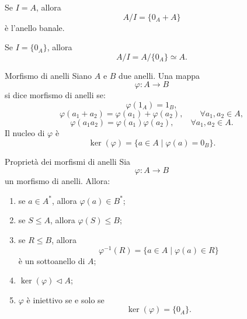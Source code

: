 \documentclass[a4paper]{article}
\begin{document}
\begin{radioactive}
Se \(I=A\), allora
\[
    A/I=\{0_A+A\}
\]
è l'anello banale.
\end{radioactive}

\begin{radioactive}
Se \(I=\{0_A\}\), allora
\[
    A/I=A/\{0_A\}\simeq A.
\]
\end{radioactive}

\begin{radioactive}
\begin{snippetdefinition}{Morfismo di anelli}
    Siano \(A\) e \(B\) due anelli.
    Una mappa
    \[
        \varphi\colon A\to B
    \]
    si dice morfismo di anelli se:
    \[
        \varphi(1_A)=1_B,
    \]
    \[
        \varphi(a_1+a_2)=\varphi(a_1)+\varphi(a_2),
        \qquad
        \forall a_1,a_2\in A,
    \]
    \[
        \varphi(a_1a_2)=\varphi(a_1)\varphi(a_2),
        \qquad
        \forall a_1,a_2\in A.
    \]
    Il nucleo di \(\varphi\) è
    \[
        \ker(\varphi)
        =
        \{a\in A\mid \varphi(a)=0_B\}.
    \]
\end{snippetdefinition}
\end{radioactive}

\begin{radioactive}
\begin{snippetproposition}{Proprietà dei morfismi di anelli}
    Sia
    \[
        \varphi\colon A\to B
    \]
    un morfismo di anelli. Allora:
    \begin{enumerate}
        \item se \(a\in A^\ast\), allora \(\varphi(a)\in B^\ast\);
        \item se \(S\leq A\), allora \(\varphi(S)\leq B\);
        \item se \(R\leq B\), allora
        \[
            \varphi^{-1}(R)=\{a\in A\mid \varphi(a)\in R\}
        \]
        è un sottoanello di \(A\);
        \item \(\ker(\varphi)\triangleleft A\);
        \item \(\varphi\) è iniettivo se e solo se
        \[
            \ker(\varphi)=\{0_A\}.
        \]
    \end{enumerate}
\end{snippetproposition}
\end{radioactive}
\end{document}
